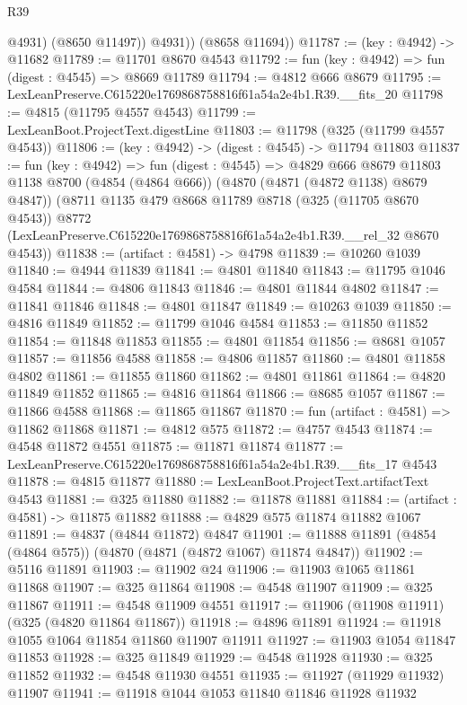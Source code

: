 \begin{lexlean}{R39}
\begin{coremodule}
              @4931)
            (@8650 @11497))
          @4931))
      (@8658 @11694))
@11787 := (key : @4942) -> @11682
@11789 := @11701 @8670 @4543
@11792 := fun (key : @4942) => fun (digest : @4545) => @8669 @11789
@11794 := @4812 @666 @8679
@11795 := LexLeanPreserve.C615220e1769868758816f61a54a2e4b1.R39.__fits_20
@11798 := @4815 (@11795 @4557 @4543)
@11799 := LexLeanBoot.ProjectText.digestLine
@11803 := @11798 (@325 (@11799 @4557 @4543))
@11806 := (key : @4942) -> (digest : @4545) -> @11794 @11803
@11837 := fun (key : @4942) =>
  fun (digest : @4545) =>
  @4829
    @666
    @8679
    @11803
    @1138
    @8700
    (@4854 (@4864 @666))
    (@4870 (@4871 (@4872 @1138) @8679 @4847))
    (@8711
      @1135
      @479
      @8668
      @11789
      @8718
      (@325 (@11705 @8670 @4543))
      @8772
      (LexLeanPreserve.C615220e1769868758816f61a54a2e4b1.R39.__rel_32 @8670 @4543))
@11838 := (artifact : @4581) -> @4798
@11839 := @10260 @1039
@11840 := @4944 @11839
@11841 := @4801 @11840
@11843 := @11795 @1046 @4584
@11844 := @4806 @11843
@11846 := @4801 @11844 @4802
@11847 := @11841 @11846
@11848 := @4801 @11847
@11849 := @10263 @1039
@11850 := @4816 @11849
@11852 := @11799 @1046 @4584
@11853 := @11850 @11852
@11854 := @11848 @11853
@11855 := @4801 @11854
@11856 := @8681 @1057
@11857 := @11856 @4588
@11858 := @4806 @11857
@11860 := @4801 @11858 @4802
@11861 := @11855 @11860
@11862 := @4801 @11861
@11864 := @4820 @11849 @11852
@11865 := @4816 @11864
@11866 := @8685 @1057
@11867 := @11866 @4588
@11868 := @11865 @11867
@11870 := fun (artifact : @4581) => @11862 @11868
@11871 := @4812 @575
@11872 := @4757 @4543
@11874 := @4548 @11872 @4551
@11875 := @11871 @11874
@11877 := LexLeanPreserve.C615220e1769868758816f61a54a2e4b1.R39.__fits_17 @4543
@11878 := @4815 @11877
@11880 := LexLeanBoot.ProjectText.artifactText @4543
@11881 := @325 @11880
@11882 := @11878 @11881
@11884 := (artifact : @4581) -> @11875 @11882
@11888 := @4829 @575 @11874 @11882 @1067
@11891 := @4837 (@4844 @11872) @4847
@11901 := @11888 @11891 (@4854 (@4864 @575)) (@4870 (@4871 (@4872 @1067) @11874 @4847))
@11902 := @5116 @11891
@11903 := @11902 @24
@11906 := @11903 @1065 @11861 @11868
@11907 := @325 @11864
@11908 := @4548 @11907
@11909 := @325 @11867
@11911 := @4548 @11909 @4551
@11917 := @11906 (@11908 @11911) (@325 (@4820 @11864 @11867))
@11918 := @4896 @11891
@11924 := @11918 @1055 @1064 @11854 @11860 @11907 @11911
@11927 := @11903 @1054 @11847 @11853
@11928 := @325 @11849
@11929 := @4548 @11928
@11930 := @325 @11852
@11932 := @4548 @11930 @4551
@11935 := @11927 (@11929 @11932) @11907
@11941 := @11918 @1044 @1053 @11840 @11846 @11928 @11932

\end{coremodule}
\end{lexlean}
